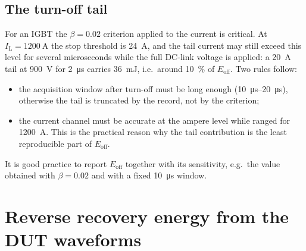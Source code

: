 \documentclass[11pt,a4paper]{article}
\newcommand{\Eoff}{E_{\mathrm{off}}}
\newcommand{\IL}{I_{\mathrm{L}}}
\begin{document}
\subsection{The turn-off tail}

For an IGBT the $\beta=0.02$ criterion applied to the current is critical. At
$\IL=\SI{1200}{\ampere}$ the stop threshold is \SI{24}{\ampere}, and the tail current may
still exceed this level for several microseconds while the full DC-link voltage is
applied: a \SI{20}{\ampere} tail at \SI{900}{\volt} for \SI{2}{\micro\second} carries
\SI{36}{\milli\joule}, i.e.\ around \SI{10}{\percent} of $\Eoff$. Two rules follow:
\begin{itemize}
\item the acquisition window after turn-off must be long enough
(\SIrange{10}{20}{\micro\second}), otherwise the tail is truncated by the record, not by
the criterion;
\item the current channel must be accurate at the ampere level while ranged for
\SI{1200}{\ampere}. This is the practical reason why the tail contribution is the least
reproducible part of $\Eoff$.
\end{itemize}
It is good practice to report $\Eoff$ together with its sensitivity, e.g.\ the value
obtained with $\beta=0.02$ and with a fixed \SI{10}{\micro\second} window.

\section{Reverse recovery energy from the DUT waveforms}
\end{document}
